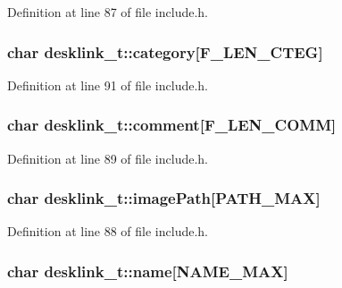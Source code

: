 Definition at line 87 of file include.\-h.

\hypertarget{structdesklink__t_add249bcfddfb8faa30cab3c6a7977883}{
\subsubsection[{category}]{\setlength{\rightskip}{0pt plus 5cm}char desklink\-\_\-t\-::category\mbox{[}{\bf F\-\_\-\-L\-E\-N\-\_\-\-C\-T\-E\-G}\mbox{]}}}\label{structdesklink__t_add249bcfddfb8faa30cab3c6a7977883}


Definition at line 91 of file include.\-h.

\hypertarget{structdesklink__t_a0efc59f36ee30fbd57b45311fa2b419b}{
\subsubsection[{comment}]{\setlength{\rightskip}{0pt plus 5cm}char desklink\-\_\-t\-::comment\mbox{[}{\bf F\-\_\-\-L\-E\-N\-\_\-\-C\-O\-M\-M}\mbox{]}}}\label{structdesklink__t_a0efc59f36ee30fbd57b45311fa2b419b}


Definition at line 89 of file include.\-h.

\hypertarget{structdesklink__t_ab0de75054dd03a6b44b273ebd1323ae8}{
\subsubsection[{image\-Path}]{\setlength{\rightskip}{0pt plus 5cm}char desklink\-\_\-t\-::image\-Path\mbox{[}P\-A\-T\-H\-\_\-\-M\-A\-X\mbox{]}}}\label{structdesklink__t_ab0de75054dd03a6b44b273ebd1323ae8}


Definition at line 88 of file include.\-h.

\hypertarget{structdesklink__t_aff78ef2e29eaf6152f7586605dff6feb}{
\subsubsection[{name}]{\setlength{\rightskip}{0pt plus 5cm}char desklink\-\_\-t\-::name\mbox{[}N\-A\-M\-E\-\_\-\-M\-A\-X\mbox{]}}}\label{structdesklink__t_aff78ef2e29eaf6152f7586605dff6feb}


